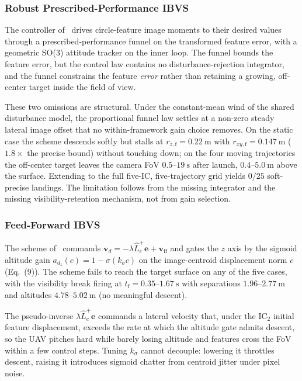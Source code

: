 \documentclass[10pt,journal]{IEEEtran}
\begin{document}
\subsubsection{Robust Prescribed-Performance IBVS \cite{lin2023}}

The controller of~\cite{lin2023} drives circle-feature image moments to their desired values through a prescribed-performance funnel on the transformed feature error, with a geometric SO(3) attitude tracker on the inner loop. The funnel bounds the feature error, but the control law contains no disturbance-rejection integrator, and the funnel constrains the feature \emph{error} rather than retaining a growing, off-center target inside the field of view.

These two omissions are structural. Under the constant-mean wind of the shared disturbance model, the proportional funnel law settles at a non-zero steady lateral image offset that no within-framework gain choice removes. On the static case the scheme descends softly but stalls at $r_{z,\text{f}}=0.22~\text{m}$ with $r_{xy,\text{f}}=0.147~\text{m}$ ($1.8\times$ the precise bound) without touching down; on the four moving trajectories the off-center target leaves the camera FoV $0.5$--$19~\text{s}$ after launch, $0.4$--$5.0~\text{m}$ above the surface. Extending to the full five-IC, five-trajectory grid yields $0/25$ soft-precise landings. The limitation follows from the missing integrator and the missing visibility-retention mechanism, not from gain selection.

\subsubsection{Feed-Forward IBVS \cite{cho2022}}

The scheme of~\cite{cho2022} commands $\boldsymbol{v}_d=-\lambda\hat{L}_e^+\boldsymbol{e}+\boldsymbol{v}_{\text{ff}}$ and gates the $z$ axis by the sigmoid altitude gain $a_{d_z}(c)=1-\sigma(k_\sigma c)$ on the image-centroid displacement norm $c$ (Eq.~(9)). The scheme fails to reach the target surface on any of the five cases, with the visibility break firing at $t_\text{f}=0.35$--$1.67~\text{s}$ with separations $1.96$--$2.77~\text{m}$ and altitudes $4.78$--$5.02~\text{m}$ (no meaningful descent).

The pseudo-inverse $\lambda\hat{L}_e^+\boldsymbol{e}$ commands a lateral velocity that, under the IC$_2$ initial feature displacement, exceeds the rate at which the altitude gate admits descent, so the UAV pitches hard while barely losing altitude and features cross the FoV within a few control steps. Tuning $k_\sigma$ cannot decouple: lowering it throttles descent, raising it introduces sigmoid chatter from centroid jitter under pixel noise.
\end{document}
